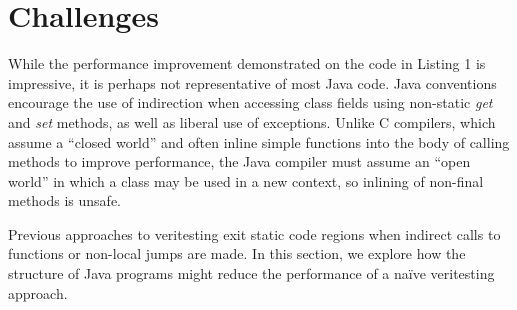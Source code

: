 \section{Challenges}

While the performance improvement demonstrated on the code in Listing 1 is impressive, it is perhaps not representative of most Java code.  Java conventions encourage the use of indirection when accessing class fields using non-static {\em get} and {\em set} methods, as well as liberal use of exceptions.  Unlike C compilers, which assume a ``closed world'' and often inline simple functions into the body of calling methods to improve performance, the Java compiler must assume an ``open world'' in which a class may be used in a new context, so inlining of non-final methods is unsafe.

Previous approaches to veritesting exit static code regions when indirect calls to functions or non-local jumps are made.  In this section, we explore how the structure of Java programs might reduce the performance of a na\"ive veritesting approach.

%
%
%
